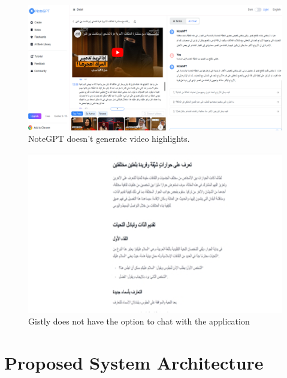 \documentclass{bscs}
\begin{document}
\begin{figure}[h]
    \centering
    \includegraphics[width=1.1\textwidth]{figure_e.png}  
    \caption{NoteGPT doesn't generate video highlights.}
    \label{fig:figure5}
\end{figure}

\begin{figure}[h]
    \centering
    \includegraphics[width=1.1\textwidth]{figure_d.png}  
    \caption{Gistly does not have the option to chat with the application}
    \label{fig:figure4}
\end{figure}

\chapter{Proposed System Architecture }
\end{document}
